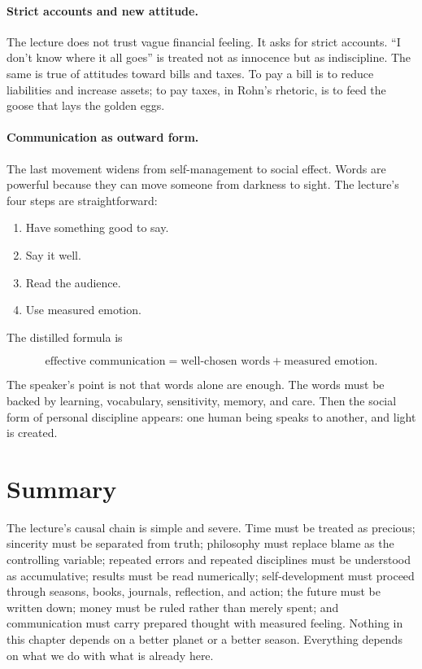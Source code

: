 \paragraph{Strict accounts and new attitude.}
The lecture does not trust vague financial feeling. It asks for strict accounts. ``I don't know where it all goes'' is treated not as innocence but as indiscipline. The same is true of attitudes toward bills and taxes. To pay a bill is to reduce liabilities and increase assets; to pay taxes, in Rohn's rhetoric, is to feed the goose that lays the golden eggs.

\paragraph{Communication as outward form.}
The last movement widens from self-management to social effect. Words are powerful because they can move someone from darkness to sight. The lecture's four steps are straightforward:

\begin{enumerate}
\item Have something good to say.
\item Say it well.
\item Read the audience.
\item Use measured emotion.
\end{enumerate}

The distilled formula is

\begin{equation}
\text{effective communication}
=
\text{well-chosen words}
+
\text{measured emotion}.
\end{equation}

The speaker's point is not that words alone are enough. The words must be backed by learning, vocabulary, sensitivity, memory, and care. Then the social form of personal discipline appears: one human being speaks to another, and light is created.

\section{Summary}

The lecture's causal chain is simple and severe. Time must be treated as precious; sincerity must be separated from truth; philosophy must replace blame as the controlling variable; repeated errors and repeated disciplines must be understood as accumulative; results must be read numerically; self-development must proceed through seasons, books, journals, reflection, and action; the future must be written down; money must be ruled rather than merely spent; and communication must carry prepared thought with measured feeling. Nothing in this chapter depends on a better planet or a better season. Everything depends on what we do with what is already here.